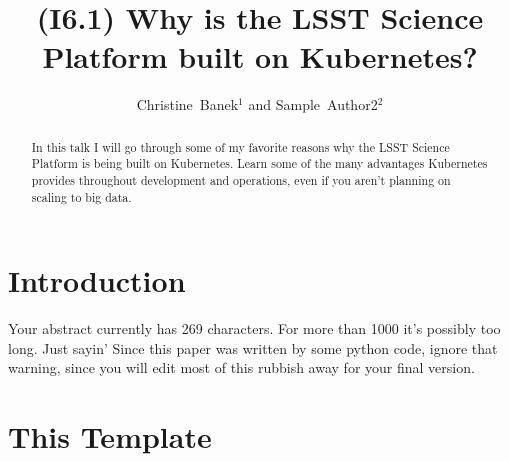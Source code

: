 \documentclass[11pt,twoside]{article}
\begin{document}
\title{(I6.1) Why is the LSST Science Platform built on Kubernetes?}


\author{Christine~Banek$^1$ and Sample~Author2$^2$}




  
\begin{abstract}
In this talk I will go through some of my favorite reasons
why the LSST Science Platform is being built on Kubernetes.
Learn some of the many advantages Kubernetes provides throughout
development and operations, even if you aren't planning on
scaling to big data.

\end{abstract}

\section{Introduction}

Your abstract currently has 269 characters. For more than 1000
it's possibly too long. Just sayin' Since this paper was written by
some python code, ignore that warning, since you will edit most of
this rubbish away for your final version.


\section{This Template}
\end{document}
